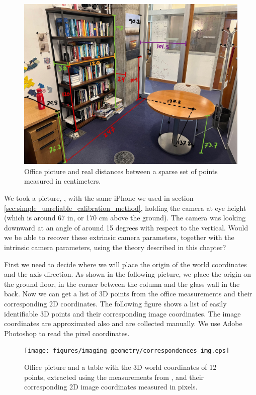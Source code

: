 \begin{figure}[ht]
\centerline{
\includegraphics[width=1\linewidth]{figures/imaging_geometry/office_with_measures_2.jpg}
}
\caption{Office picture and real distances between a sparse set of points measured in centimeters.}
\label{fig:office_measurements}
\end{figure}


We took a picture, \fig{\ref{fig:office_measurements}}, with the same iPhone we used in section \ref{sec:simple_unreliable_calibration_method}, holding the camera at eye height (which is around 67 in, or 170 cm above the ground). The camera was looking downward at an angle of around 15 degrees with respect to the vertical. Would we be able to recover these extrinsic camera parameters, together with the intrinsic camera parameters, using the theory described in this chapter?

First we need to decide where we will place the origin of the world coordinates and the axis direction. As shown in the following picture, we place the origin on the ground floor, in the corner between the column and the glass wall in the back.  Now we can get a list of 3D points from the office measurements and their corresponding 2D coordinates. The following figure shows a list of easily identifiable 3D points and their corresponding image coordinates.  The image coordinates are approximated also and are collected manually. We use Adobe Photoshop to read the pixel coordinates. 

\begin{figure}[ht]
\centerline{
\texttt{[image: figures/imaging\_geometry/correspondences\_img.eps]}
}
\caption{Office picture and a table with the 3D world coordinates of 12 points, extracted using the measurements from \fig{\ref{fig:office_measurements}}, and their corresponding 2D image coordinates measured in pixels.}
\label{fig:office_correspondences_img}
\end{figure}

